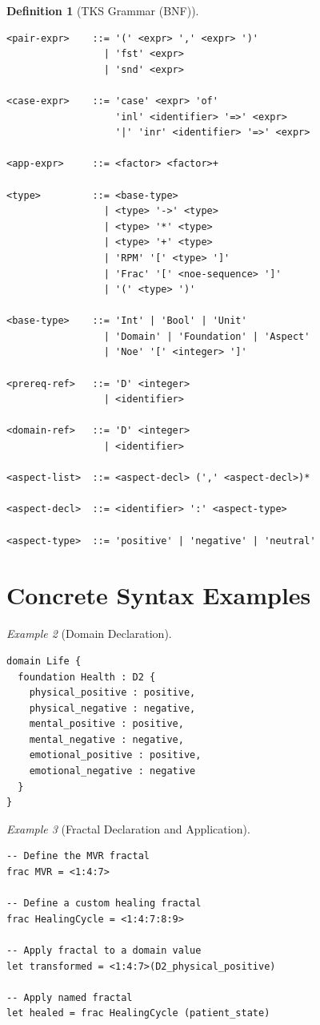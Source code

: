 \documentclass[11pt,twoside,openright]{book}
\theoremstyle{definition}
\newtheorem{definition}{Definition}[chapter]
\theoremstyle{plain}
\theoremstyle{remark}
\newtheorem{example}[definition]{Example}
\begin{document}
\begin{definition}[TKS Grammar (BNF)]
\begin{verbatim}
<pair-expr>    ::= '(' <expr> ',' <expr> ')'
                 | 'fst' <expr>
                 | 'snd' <expr>

<case-expr>    ::= 'case' <expr> 'of'
                   'inl' <identifier> '=>' <expr>
                   '|' 'inr' <identifier> '=>' <expr>

<app-expr>     ::= <factor> <factor>+

<type>         ::= <base-type>
                 | <type> '->' <type>
                 | <type> '*' <type>
                 | <type> '+' <type>
                 | 'RPM' '[' <type> ']'
                 | 'Frac' '[' <noe-sequence> ']'
                 | '(' <type> ')'

<base-type>    ::= 'Int' | 'Bool' | 'Unit'
                 | 'Domain' | 'Foundation' | 'Aspect'
                 | 'Noe' '[' <integer> ']'

<prereq-ref>   ::= 'D' <integer>
                 | <identifier>

<domain-ref>   ::= 'D' <integer>
                 | <identifier>

<aspect-list>  ::= <aspect-decl> (',' <aspect-decl>)*

<aspect-decl>  ::= <identifier> ':' <aspect-type>

<aspect-type>  ::= 'positive' | 'negative' | 'neutral'
\end{verbatim}
\end{definition}

\section{Concrete Syntax Examples}

\begin{example}[Domain Declaration]
\label{ex:domain-syntax}
\begin{verbatim}
domain Life {
  foundation Health : D2 {
    physical_positive : positive,
    physical_negative : negative,
    mental_positive : positive,
    mental_negative : negative,
    emotional_positive : positive,
    emotional_negative : negative
  }
}
\end{verbatim}
\end{example}

\begin{example}[Fractal Declaration and Application]
\label{ex:fractal-syntax}
\begin{verbatim}
-- Define the MVR fractal
frac MVR = <1:4:7>

-- Define a custom healing fractal
frac HealingCycle = <1:4:7:8:9>

-- Apply fractal to a domain value
let transformed = <1:4:7>(D2_physical_positive)

-- Apply named fractal
let healed = frac HealingCycle (patient_state)
\end{verbatim}
\end{example}
\end{document}
